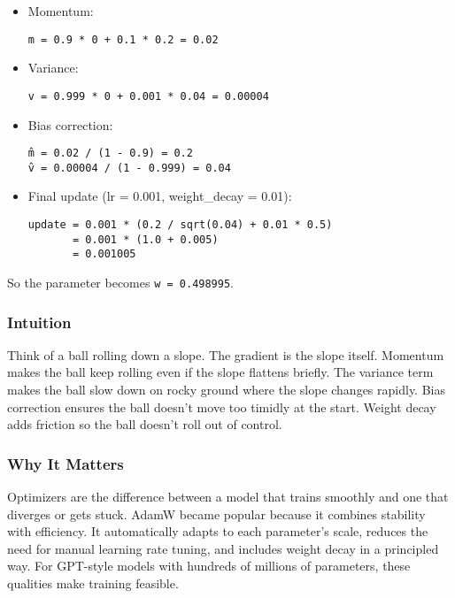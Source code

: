 \documentclass[
  letterpaper,
  DIV=11,
  numbers=noendperiod]{scrreprt}
\begin{document}
\begin{itemize}
\item
  Momentum:

\begin{verbatim}
m = 0.9 * 0 + 0.1 * 0.2 = 0.02
\end{verbatim}
\item
  Variance:

\begin{verbatim}
v = 0.999 * 0 + 0.001 * 0.04 = 0.00004
\end{verbatim}
\item
  Bias correction:

\begin{verbatim}
m̂ = 0.02 / (1 - 0.9) = 0.2
v̂ = 0.00004 / (1 - 0.999) = 0.04
\end{verbatim}
\item
  Final update (lr = 0.001, weight\_decay = 0.01):

\begin{verbatim}
update = 0.001 * (0.2 / sqrt(0.04) + 0.01 * 0.5)
       = 0.001 * (1.0 + 0.005)
       = 0.001005
\end{verbatim}
\end{itemize}

So the parameter becomes \texttt{w\ =\ 0.498995}.

\subsubsection{Intuition}\label{intuition-1}

Think of a ball rolling down a slope. The gradient is the slope itself.
Momentum makes the ball keep rolling even if the slope flattens briefly.
The variance term makes the ball slow down on rocky ground where the
slope changes rapidly. Bias correction ensures the ball doesn't move too
timidly at the start. Weight decay adds friction so the ball doesn't
roll out of control.

\subsubsection{Why It Matters}\label{why-it-matters-26}

Optimizers are the difference between a model that trains smoothly and
one that diverges or gets stuck. AdamW became popular because it
combines stability with efficiency. It automatically adapts to each
parameter's scale, reduces the need for manual learning rate tuning, and
includes weight decay in a principled way. For GPT-style models with
hundreds of millions of parameters, these qualities make training
feasible.
\end{document}

